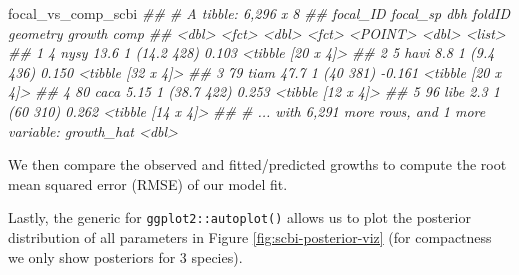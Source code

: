 \documentclass[12pt]{article}
\newenvironment{Shaded}{\begin{snugshade}}{\end{snugshade}}
\newcommand{\CommentTok}[1]{\textcolor[rgb]{0.56,0.35,0.01}{\textit{#1}}}
\newcommand{\DataTypeTok}[1]{\textcolor[rgb]{0.13,0.29,0.53}{#1}}
\newcommand{\KeywordTok}[1]{\textcolor[rgb]{0.13,0.29,0.53}{\textbf{#1}}}
\newcommand{\NormalTok}[1]{#1}
\newcommand{\OperatorTok}[1]{\textcolor[rgb]{0.81,0.36,0.00}{\textbf{#1}}}
\newcommand{\StringTok}[1]{\textcolor[rgb]{0.31,0.60,0.02}{#1}}
\begin{document}
\begin{Shaded}
\end{Shaded}

\begin{Shaded}
\begin{Highlighting}[]
\NormalTok{focal_vs_comp_scbi}
\CommentTok{## # A tibble: 6,296 x 8}
\CommentTok{##   focal_ID focal_sp   dbh foldID   geometry growth comp             }
\CommentTok{##      <dbl> <fct>    <dbl> <fct>     <POINT>  <dbl> <list>           }
\CommentTok{## 1        4 nysy     13.6  1      (14.2 428)  0.103 <tibble [20 x 4]>}
\CommentTok{## 2        5 havi      8.8  1       (9.4 436)  0.150 <tibble [32 x 4]>}
\CommentTok{## 3       79 tiam     47.7  1        (40 381) -0.161 <tibble [20 x 4]>}
\CommentTok{## 4       80 caca      5.15 1      (38.7 422)  0.253 <tibble [12 x 4]>}
\CommentTok{## 5       96 libe      2.3  1        (60 310)  0.262 <tibble [14 x 4]>}
\CommentTok{## # ... with 6,291 more rows, and 1 more variable: growth_hat <dbl>}
\end{Highlighting}
\end{Shaded}

We then compare the observed and fitted/predicted growths to compute the
root mean squared error (RMSE) of our model fit.

\begin{Shaded}
\end{Shaded}

Lastly, the generic for \texttt{ggplot2::autoplot()} allows us to plot
the posterior distribution of all parameters in Figure
\ref{fig:scbi-posterior-viz} (for compactness we only show posteriors
for 3 species).
\end{document}
